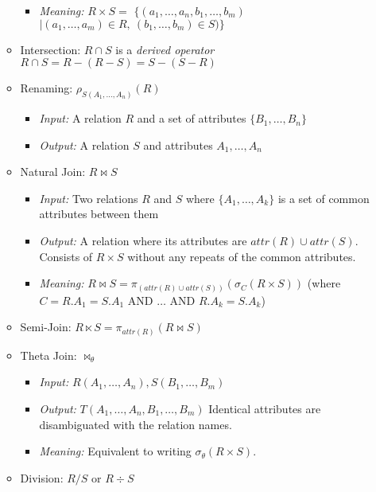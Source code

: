 \documentclass[landscape,8pt]{extarticle}
\begin{document}
\begin{multicols}{4}
\begin{itemize}
\begin{itemize}
\begin{itemize}
                \item \emph{Meaning:} $R \times S =$ $ \{(a_1, \dots, a_n, b_1, \dots, b_m) $ $| (a_1,
                \dots, a_m) \in R,\ (b_1, \dots, b_m) \in S) \}$
            \end{itemize}
            \item Intersection: $R \cap S$ is a \emph{derived operator} \\
            $R \cap S = R - (R - S) = S - (S - R)$
        \item Renaming: $\rho_{S(A_1, \dots, A_n)}(R)$
        \begin{itemize}
            \item \emph{Input:} A relation $R$ and a set of attributes $\{B_1, \dots, B_n\}$
            \item \emph{Output:} A relation $S$ and attributes $A_1, \dots, A_n$
        \end{itemize}
        \item Natural Join: $R \bowtie S$
        \begin{itemize}
            \item \emph{Input:} Two relations $R$ and $S$ where $\{A_1, \dots, A_k\}$ is a set of
            common attributes between them
            \item \emph{Output:} A relation where its attributes are $attr(R) \cup attr(S)$.
            Consists of $R \times S$ without any repeats of the common attributes.
            \item \emph{Meaning:} $R \bowtie S = \pi_{(attr(R) \cup attr(S))} (\sigma_{C} (R \times
            S))$ (where $C = R.A_1 = S.A_1 \text{ AND } \dots \text{ AND } R.A_k = S.A_k$)
        \end{itemize}
        \item Semi-Join: $R \ltimes S = \pi_{attr(R)}(R \bowtie S)$
        \item Theta Join: $\bowtie_\theta$
        \begin{itemize}
            \item \emph{Input:} $R(A_1, \dots, A_n), S(B_1, \dots, B_m)$
            \item \emph{Output:} $T(A_1, \dots, A_n, B_1, \dots, B_m)$ Identical attributes are
            disambiguated with the relation names.
            \item \emph{Meaning:} Equivalent to writing $\sigma_{\theta}(R \times S)$.
        \end{itemize}
        \item Division: $R/S$ or $R \div S$

\end{itemize}
\end{itemize}
\end{multicols}
\end{document}
